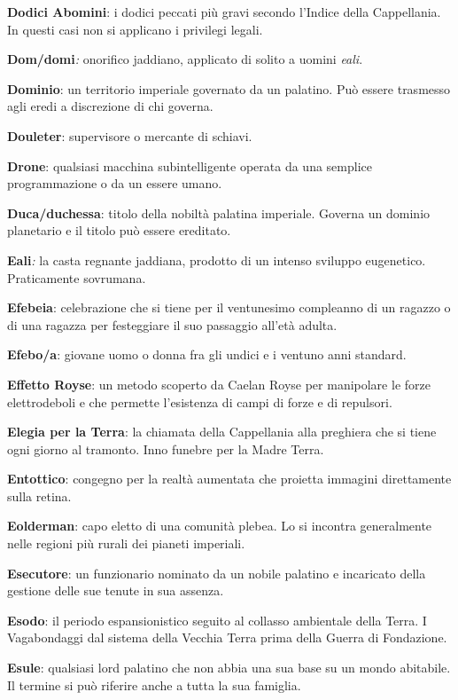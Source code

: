 \textbf{Dodici Abomini}: i dodici peccati più gravi secondo l'Indice
della Cappellania. In questi casi non si applicano i privilegi legali.

\textbf{Dom/domi}\emph{:} onorifico jaddiano, applicato di solito a
uomini \emph{eali}.

\textbf{Dominio}: un territorio imperiale governato da un palatino. Può
essere trasmesso agli eredi a discrezione di chi governa.

\textbf{Douleter}: supervisore o mercante di schiavi.

\textbf{Drone}: qualsiasi macchina subintelligente operata da una
semplice programmazione o da un essere umano.

\textbf{Duca/duchessa}: titolo della nobiltà palatina imperiale. Governa
un dominio planetario e il titolo può essere ereditato.

\textbf{Eali}\emph{:} la casta regnante jaddiana, prodotto di un intenso
sviluppo eugenetico. Praticamente sovrumana.

\textbf{Efebeia}: celebrazione che si tiene per il ventunesimo
compleanno di un ragazzo o di una ragazza per festeggiare il suo
passaggio all'età adulta.

\textbf{Efebo/a}: giovane uomo o donna fra gli undici e i ventuno anni
standard.

\textbf{Effetto Royse}: un metodo scoperto da Caelan Royse per
manipolare le forze elettrodeboli e che permette l'esistenza di campi di
forze e di repulsori.

\textbf{Elegia per la Terra}: la chiamata della Cappellania alla
preghiera che si tiene ogni giorno al tramonto. Inno funebre per la
Madre Terra.

\textbf{Entottico}: congegno per la realtà aumentata che proietta
immagini direttamente sulla retina.

\textbf{Eolderman}: capo eletto di una comunità plebea. Lo si incontra
generalmente nelle regioni più rurali dei pianeti imperiali.

\textbf{Esecutore}: un funzionario nominato da un nobile palatino e
incaricato della gestione delle sue tenute in sua assenza.

\textbf{Esodo}: il periodo espansionistico seguito al collasso
ambientale della Terra. I Vagabondaggi dal sistema della Vecchia Terra
prima della Guerra di Fondazione.

\textbf{Esule}: qualsiasi lord palatino che non abbia una sua base su un
mondo abitabile. Il termine si può riferire anche a tutta la sua
famiglia.

